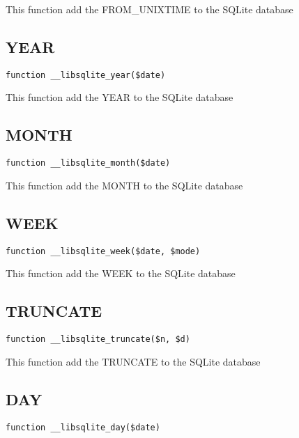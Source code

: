 \documentclass[a4paper]{book}
\begin{document}
This function add the FROM\_UNIXTIME to the SQLite database

\hypertarget{toc299}{}
\subsection{YEAR}

\begin{lstlisting}
function __libsqlite_year($date)
\end{lstlisting}

This function add the YEAR to the SQLite database

\hypertarget{toc300}{}
\subsection{MONTH}

\begin{lstlisting}
function __libsqlite_month($date)
\end{lstlisting}

This function add the MONTH to the SQLite database

\hypertarget{toc301}{}
\subsection{WEEK}

\begin{lstlisting}
function __libsqlite_week($date, $mode)
\end{lstlisting}

This function add the WEEK to the SQLite database

\hypertarget{toc302}{}
\subsection{TRUNCATE}

\begin{lstlisting}
function __libsqlite_truncate($n, $d)
\end{lstlisting}

This function add the TRUNCATE to the SQLite database

\hypertarget{toc303}{}
\subsection{DAY}

\begin{lstlisting}
function __libsqlite_day($date)
\end{lstlisting}
\end{document}
